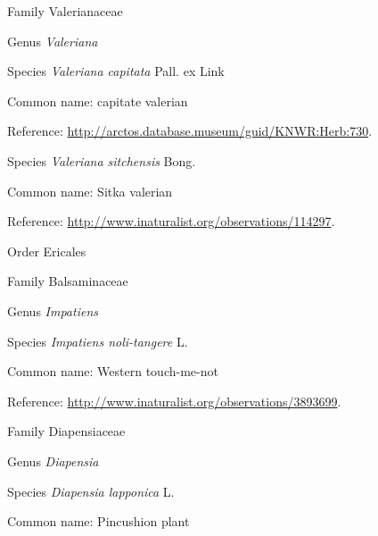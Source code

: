 \documentclass[9pt, article]{memoir}
\begin{document}
\begin{multicols}{2}
\vspace{6pt}\noindent\hspace{24pt}Family Valerianaceae


\vspace{6pt}\noindent\hspace{30pt}Genus \textit{Valeriana}


\vspace{6pt}\noindent\hspace{36pt}Species \textit{Valeriana capitata} Pall. ex Link


Common name: capitate valerian

Reference: 
\url{http://arctos.database.museum/guid/KNWR:Herb:730}.

\vspace{6pt}\noindent\hspace{36pt}Species \textit{Valeriana sitchensis} Bong.


Common name: Sitka valerian

Reference: 
\url{http://www.inaturalist.org/observations/114297}.

\vspace{6pt}\noindent\hspace{18pt}Order Ericales


\vspace{6pt}\noindent\hspace{24pt}Family Balsaminaceae


\vspace{6pt}\noindent\hspace{30pt}Genus \textit{Impatiens}


\vspace{6pt}\noindent\hspace{36pt}Species \textit{Impatiens noli-tangere} L.


Common name: Western touch-me-not

Reference: 
\url{http://www.inaturalist.org/observations/3893699}.

\vspace{6pt}\noindent\hspace{24pt}Family Diapensiaceae


\vspace{6pt}\noindent\hspace{30pt}Genus \textit{Diapensia}


\vspace{6pt}\noindent\hspace{36pt}Species \textit{Diapensia lapponica} L.


Common name: Pincushion plant


\end{multicols}
\end{document}
